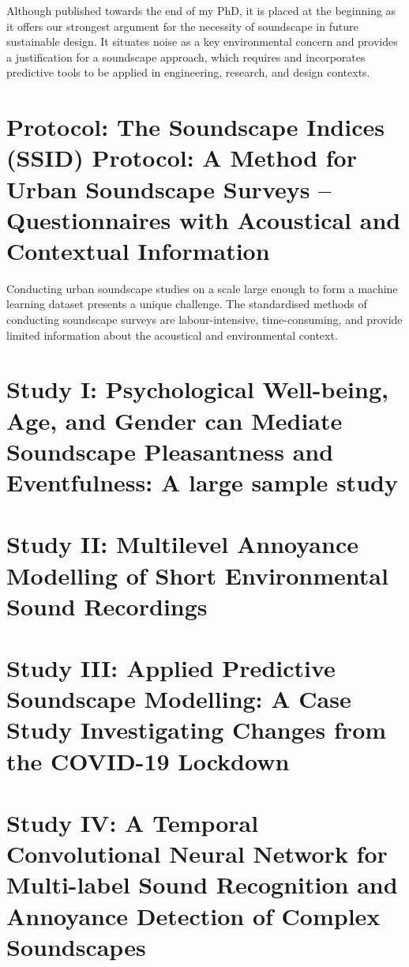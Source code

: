 \documentclass[twoside,fontsize=12pt,titlepage]{scrbook}
\begin{document}
 Although published towards the end of my PhD, it is placed at the beginning as it offers our strongest argument for the necessity of soundscape in future sustainable design. It situates noise as a key environmental concern and provides a justification for a soundscape approach, which requires and incorporates predictive tools to be applied in engineering, research, and design contexts.

 \newpage
\section[Protocol]{Protocol: The Soundscape Indices (SSID) Protocol: A Method for Urban Soundscape Surveys -- Questionnaires with Acoustical and Contextual Information}

 Conducting urban soundscape studies on a scale large enough to form a machine learning dataset presents a unique challenge. The standardised methods of conducting soundscape surveys \citep{ISO12913_2_2018IOS} are labour-intensive, time-consuming, and provide limited information about the acoustical and environmental context.

 

\section[Study I]{Study I: Psychological Well-being, Age, and Gender can Mediate Soundscape Pleasantness and Eventfulness: A large sample study}

 

\section[Study II]{Study II: Multilevel Annoyance Modelling of Short Environmental Sound Recordings}

 

\section[Study III]{Study III: Applied Predictive Soundscape Modelling: A Case Study Investigating Changes from the COVID-19 Lockdown}

 \newpage
\section[Study IV]{Study IV: A Temporal Convolutional Neural Network for Multi-label Sound Recognition and Annoyance Detection of Complex Soundscapes}
\end{document}
